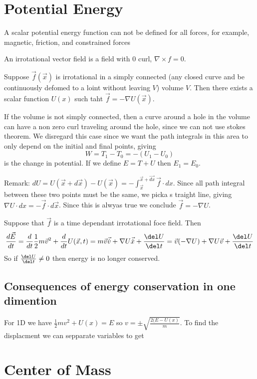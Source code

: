 \documentclass{homework}
\begin{document}
\section{Potential Energy}
A scalar potential energy function can not be defined for all forces, for example, magnetic, friction, and constrained forces

An irrotational vector field is a field with $0$ curl, $\nabla \times f = 0$. 

Suppose $\vec{f}(\vec{x})$ is irrotational in a simply connected (any closed curve and be continuously defomed to a loint without leaving $V$) volume $V$. Then there exists a scalar function $U(x)$ such taht $\vec{f} = - \nabla U(\vec{x})$.

If the volume is not simply connected, then a curve around a hole in the volume can have a non zero curl traveling around the hole, since we can not use stokes theorem. We disregard this case since we want the path integrals in this area to only depend on the initial and final points, giving 
\[W = T_1 - T_0 = -(U_1 - U_0)\]
is the change in potential. If we define $E = T + U$ then $E_1 = E_0$. 

Remark: $dU = U(\vec{x} + d\vec{x}) - U(\vec{x}) = -\int_{\vec{x}}^{\vec{x} + \vec{dx}}\vec{f}\cdot dx$. Since all path integral between these two points must be the same, we picka s traight line, giving $\nabla U \cdot dx = -\vec{f}\cdot d\vec{x}$. Since this is alwyas true we conclude $\vec{f} = - \nabla U$. 


Suppose that $\vec{f}$ is a time dependant irrotational foce field. Then
\[\frac{d\vec{E}}{dt} = \frac{d}{dt}\frac{1}{2}m\vec{v}^2 + \frac{d}{dt}U(\vec{x},t)  = m\vec{v}\vec{\dot{v}} + \nabla U \vec{\dot{x}} + \frac{\del U}{\del t} = \vec{v} (-\nabla U) + \nabla U \vec{v} + \frac{\del U}{\del t}\]
So if $\frac{\del U}{\del t} \neq 0$ then energy is no longer conserved.

\subsection{Consequences of energy conservation in one dimention}
For 1D we have $\frac{1}{2}mv^2 + U(x) = E$ so $v = \pm \sqrt{\frac{2(E-U(x)}{m}}$. To find the displacment we can sepparate variables to get





\section{Center of Mass}
\end{document}

